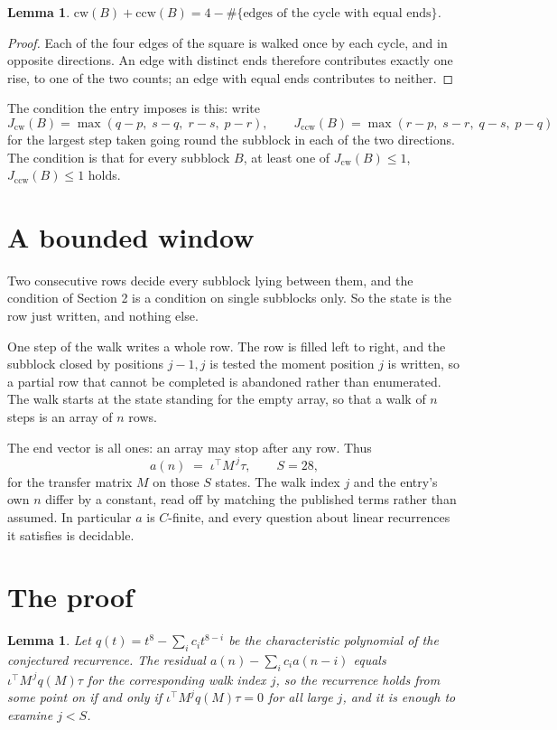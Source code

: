 \documentclass[11pt,a4paper]{article}
\theoremstyle{plain}
\newtheorem{lemma}[theorem]{Lemma}
\theoremstyle{definition}
\begin{document}
\begin{lemma}\label{lem:sum}
$\mathrm{cw}(B)+\mathrm{ccw}(B)=4-\#\{\text{edges of the cycle with equal ends}\}$.
\end{lemma}

\begin{proof}
Each of the four edges of the square is walked once by each cycle, and in opposite directions.
An edge with distinct ends therefore contributes exactly one rise, to one of the two counts;
an edge with equal ends contributes to neither.
\end{proof}

The condition the entry imposes is this: write
\[
J_{\mathrm{cw}}(B)=\max(q-p,\;s-q,\;r-s,\;p-r),\qquad J_{\mathrm{ccw}}(B)=\max(r-p,\;s-r,\;q-s,\;p-q)
\]
for the largest step taken going round the subblock in each of the two directions. The condition is that for every subblock $B$, at least one of $J_{\mathrm{cw}}(B)\le 1$, $J_{\mathrm{ccw}}(B)\le 1$ holds.

\section{A bounded window}

Two consecutive rows decide every subblock lying between them, and the condition of Section 2 is a condition on single subblocks only. So the state is the row just written, and nothing else.

One step of the walk writes a whole row. The row is filled left to right, and the subblock
closed by positions $j-1,j$ is tested the moment position $j$ is written, so a partial row that
cannot be completed is abandoned rather than enumerated. The walk starts at the state standing
for the empty array, so that a walk of $n$ steps is an array of $n$ rows.

The end vector is all ones: an array may stop after any row. Thus
\[
a(n)\;=\;\iota^{\!\top}M^{\,j}\tau ,\qquad S=28,
\]
for the transfer matrix $M$ on those $S$ states. The walk index $j$ and the entry's own $n$
differ by a constant, read off by matching the published terms rather than assumed. In
particular $a$ is $C$-finite, and every question about linear recurrences it satisfies is
decidable.

\section{The proof}

\begin{lemma}\label{lem:crit}
Let $q(t)=t^{8}-\sum_i c_it^{8-i}$ be the characteristic polynomial of the
conjectured recurrence. The residual $a(n)-\sum_ic_ia(n-i)$ equals
$\iota^{\!\top}M^{\,j}q(M)\tau$ for the corresponding walk index $j$, so the recurrence
holds from some point on if and only if $\iota^{\!\top}M^{j}q(M)\tau=0$ for all large $j$,
and it is enough to examine $j<S$.
\end{lemma}
\end{document}
